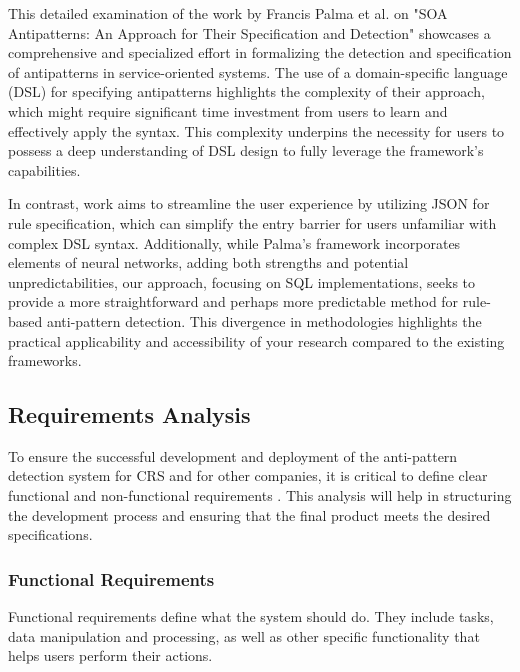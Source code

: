 \documentclass[12pt, times]{article}
\begin{document}
\hspace*{5mm} This detailed examination of the work by Francis Palma et al. on "SOA Antipatterns: An Approach for Their Specification and Detection" showcases a comprehensive and specialized effort in formalizing the detection and specification of antipatterns in service-oriented systems. The use of a domain-specific language (DSL) for specifying antipatterns highlights the complexity of their approach, which might require significant time investment from users to learn and effectively apply the syntax. This complexity underpins the necessity for users to possess a deep understanding of DSL design to fully leverage the framework's capabilities.

\hspace*{5mm} In contrast, work aims to streamline the user experience by utilizing JSON for rule specification, which can simplify the entry barrier for users unfamiliar with complex DSL syntax. Additionally, while Palma's framework incorporates elements of neural networks, adding both strengths and potential unpredictabilities, our approach, focusing on SQL implementations, seeks to provide a more straightforward and perhaps more predictable method for rule-based anti-pattern detection. This divergence in methodologies highlights the practical applicability and accessibility of your research compared to the existing frameworks.

\subsection{Requirements Analysis}

\hspace*{5mm}To ensure the successful development and deployment of the anti-pattern detection system for CRS and for other companies, it is critical to define clear functional and non-functional requirements \cite{func_req}. This analysis will help in structuring the development process and ensuring that the final product meets the desired specifications.

\subsubsection{Functional Requirements}

Functional requirements define what the system should do. They include tasks, data manipulation and processing, as well as other specific functionality that helps users perform their actions.
\end{document}
